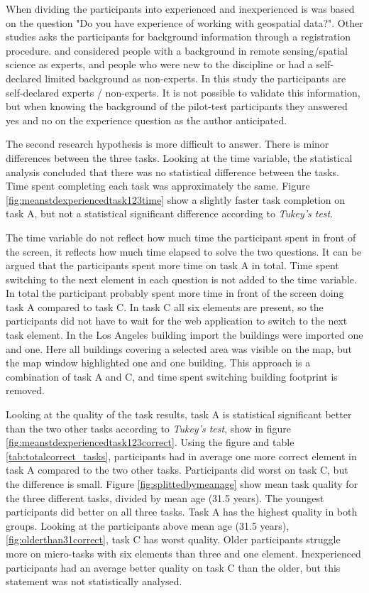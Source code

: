 When dividing the participants into experienced and inexperienced is was based on the question "Do you have experience of working with geospatial data?". Other studies asks the participants for background information through a registration procedure. \cite{See2013} and \cite{Salk2016} considered people with a background in remote sensing/spatial science as experts, and people who were new to the discipline or had a self-declared limited background as non-experts. In this study the participants are self-declared experts / non-experts. It is not possible to validate this information, but when knowing the background of the pilot-test participants they answered yes and no on the experience question as the author anticipated. 

The second research hypothesis is more difficult to answer. There is minor differences between the three tasks. Looking at the time variable, the statistical analysis concluded that there was no statistical difference between the tasks. Time spent completing each task was approximately the same. Figure \ref{fig:meanstdexperiencedtask123time} show a slightly faster task completion on task A, but not a statistical significant difference according to \textit{Tukey's test}. 

The time variable do not reflect how much time the participant spent in front of the screen, it reflects how much time elapsed to solve the two questions. It can be argued that the participants spent more time on task A in total. Time spent switching to the next element in each question is not added to the time variable. In total the participant probably spent more time in front of the screen doing task A compared to task C. In task C all six elements are present, so the participants did not have to wait for the web application to switch to the next task element. In the Los Angeles building import the buildings were imported one and one. Here all buildings covering a selected area was visible on the map, but the map window highlighted one and one building. This approach is a combination of task A and C, and time spent switching building footprint is removed. 

Looking at the quality of the task results, task A is statistical significant better than the two other tasks according to \textit{Tukey's test}, show in figure \ref{fig:meanstdexperiencedtask123correct}. Using the figure and table \ref{tab:totalcorrect_tasks}, participants had in average one more correct element in task A compared to the two other tasks. Participants did worst on task C, but the difference is small. Figure \ref{fig:splittedbymeanage} show mean task quality for the three different tasks, divided by mean age (31.5 years). The youngest participants did better on all three tasks. Task A has the highest quality in both groups. Looking at the participants above mean age (31.5 years), \ref{fig:olderthan31correct}, task C has worst quality. Older participants struggle more on micro-tasks with six elements than three and one element. Inexperienced participants had an average better quality on task C than the older, but this statement was not statistically analysed. 

